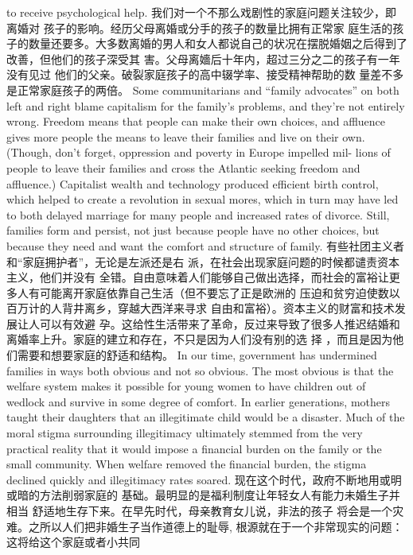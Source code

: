 \begin{paracol}{2}
to receive psychological help.
\switchcolumn
我们对一个不那么戏剧性的家庭问题关注较少，即离婚对
孩子的影响。经历父母离婚或分手的孩子的数量比拥有正常家
庭生活的孩子的数量还要多。大多数离婚的男人和女人都说自己的状况在摆脱婚姻之后得到了改善，但他们的孩子深受其
害。父母离嬙后十年内，超过三分之二的孩子有一年没有见过
他们的父亲。破裂家庭孩子的高中辍学率、接受精神帮助的数
量差不多是正常家庭孩子的两倍。
\switchcolumn*
Some communitarians and ``family advocates'' on both left
and right blame capitalism for the family's problems, and
they're not entirely wrong. Freedom means that people can
make their own choices, and affluence gives more people the
means to leave their families and live on their own. (Though,
don't forget, oppression and poverty in Europe impelled mil-
lions of people to leave their families and cross the Atlantic
seeking freedom and affluence.) Capitalist wealth and technology produced efficient birth control, which helped to create a
revolution in sexual mores, which in turn may have led to both
delayed marriage for many people and increased rates of divorce. Still, families form and persist, not just because people
have no other choices, but because they need and want the
comfort and structure of family.
\switchcolumn
有些社团主义者和“家庭拥护者”，无论是左派还是右
派，在社会出现家庭问题的时候都谴责资本主义，他们并没有
全错。自由意味着人们能够自己做出选择，而社会的富裕让更
多人有可能离开家庭依靠自己生活（但不要忘了正是欧洲的
压迫和贫穷迫使数以百万计的人背井离乡，穿越大西洋来寻求
自由和富裕）。资本主义的财富和技术发展让人可以有效避
孕。这给性生活带来了革命，反过来导致了很多人推迟结婚和
离婚率上升。家庭的建立和存在，不只是因为人们没有别的选
择 ，而且是因为他们需要和想要家庭的舒适和结构。
\switchcolumn*
In our time, government has undermined families in ways
both obvious and not so obvious. The most obvious is that the
welfare system makes it possible for young women to have children out of wedlock and survive in some degree of comfort. In
earlier generations, mothers taught their daughters that an illegitimate child would be a disaster. Much of the moral stigma
surrounding illegitimacy ultimately stemmed from the very
practical reality that it would impose a financial burden on the family or the small community. When welfare removed the financial burden, the stigma declined quickly and illegitimacy rates soared.
\switchcolumn
现在这个时代，政府不断地用或明或暗的方法削弱家庭的
基础。最明显的是福利制度让年轻女人有能力未婚生子并相当
舒适地生存下来。在早先时代，母亲教育女儿说，非法的孩子
将会是一个灾难。之所以人们把非婚生子当作道德上的耻辱,
根源就在于一个非常现实的问题：这将给这个家庭或者小共同

\end{paracol}

